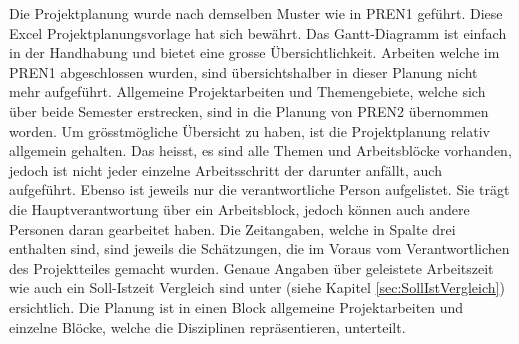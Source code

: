 \newline
Die Projektplanung wurde nach demselben Muster wie in PREN1 geführt. Diese Excel 
Projektplanungsvorlage hat sich bewährt. Das Gantt-Diagramm ist einfach in der 
Handhabung und bietet eine grosse Übersichtlichkeit. Arbeiten welche im PREN1 
abgeschlossen wurden, sind übersichtshalber in dieser Planung nicht mehr 
aufgeführt. Allgemeine Projektarbeiten und Themengebiete, welche sich über beide 
Semester erstrecken, sind in die Planung von PREN2 übernommen worden. Um 
grösstmögliche Übersicht zu haben, ist die Projektplanung relativ allgemein 
gehalten. Das heisst, es sind alle Themen und Arbeitsblöcke vorhanden, jedoch 
ist nicht jeder einzelne Arbeitsschritt der darunter anfällt, auch aufgeführt. 
Ebenso ist jeweils nur die verantwortliche Person aufgelistet. Sie trägt die 
Hauptverantwortung über ein Arbeitsblock, jedoch können auch andere Personen 
daran gearbeitet haben. Die Zeitangaben, welche in Spalte drei enthalten sind, 
sind jeweils die Schätzungen, die im Voraus vom Verantwortlichen des Projektteiles 
gemacht wurden. Genaue Angaben über geleistete Arbeitszeit wie auch ein 
Soll-Istzeit Vergleich sind unter (siehe Kapitel \ref{sec:SollIstVergleich}) ersichtlich. 
Die Planung ist in einen Block allgemeine Projektarbeiten und einzelne Blöcke, welche die 
Disziplinen repräsentieren, unterteilt.
